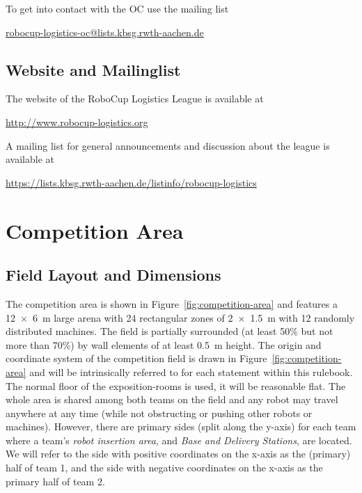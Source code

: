 \documentclass[12pt,twoside]{article}
\newcommand{\reffig}[1]{Figure~\ref{#1}}
\begin{document}
\noindent
To get into contact with the OC use the mailing list\\
\centerline{\url{robocup-logistics-oc@lists.kbsg.rwth-aachen.de}}

\subsection{Website and Mailinglist}
\label{sec:website-ml}
The website of the RoboCup Logistics League is available at\\
\centerline{\url{http://www.robocup-logistics.org}}

\smallskip
\noindent
A mailing list for general announcements and discussion about the
league is available at\\
\centerline{\url{https://lists.kbsg.rwth-aachen.de/listinfo/robocup-logistics}}


\section{Competition Area} \label{sec:area}
\subsection{Field Layout and Dimensions}
\label{sec:competition-area}

The competition area is shown in \reffig{fig:competition-area} and
features a \SI{12 x 6}{\metre} large arena with 24 rectangular zones
of \SI{2 x 1.5}{\metre} with 12 randomly distributed machines. The
field is partially surrounded (at least 50\% but not more than 70\%)
by wall elements of at least \SI{0.5}{\metre} height.  The origin and
coordinate system of the competition field is drawn in
\reffig{fig:competition-area} and will be intrinsically referred to
for each statement within this rulebook. The normal floor of the
exposition-rooms is used, it will be reasonable flat. The whole area
is shared among both teams on the field and any robot may travel
anywhere at any time (while not obstructing or pushing other robots or
machines). However, there are primary sides (split along the y-axis)
for each team where a team's \textit{robot insertion area}, and
\textit{Base and Delivery Stations}, are located. We will refer to the
side with positive coordinates on the x-axis as the (primary) half of
team 1, and the side with negative coordinates on the x-axis as the
primary half of team 2.
\end{document}
